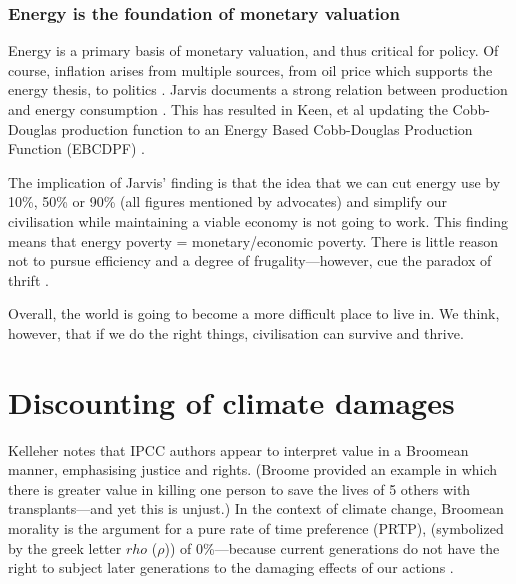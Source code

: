 \documentclass{article}
\begin{document}
\subsubsection{Energy is the foundation of monetary valuation} Energy is a primary basis of monetary valuation, and thus critical for policy. Of course, inflation arises from multiple sources, from oil price \cite{HA2023UnderstandingGlobalDriversOfInflation_HowImportantAreOilPrices} which supports the energy thesis, to politics \cite{WHITEHEAD1979THEPOLITICALCAUSESOFINFLATION}. Jarvis documents a strong relation between production and energy consumption \cite{JARVIS2018EnergyReturns_TheLong-runGrowthOfGlobalIndustrialSociety}. This has resulted in Keen, et al updating the Cobb-Douglas production function to an Energy Based Cobb-Douglas Production Function (EBCDPF) \cite{KEEN2019NoteOnEnergyInProduction}. 

The implication of Jarvis' finding is that the idea that we can cut energy use by 10\%, 50\% or 90\% (all figures mentioned by advocates) and simplify our civilisation while maintaining a viable economy is not going to work. This finding means that energy poverty = monetary/economic poverty. There is little reason not to pursue efficiency and a degree of frugality---however, cue the paradox of thrift \cite{Corden2012GlobalImbalancesAndTheParadoxOfThrift,Vermann2012ParadoxThrift,Yiannis2011DeficitReductionTheAgeOfAusterityAndTheParadoxOfInsolvency,Das2019ParadoxOfAusterityMulti-CountryEvidence}.

Overall, the world is going to become a more difficult place to live in. We think, however, that if we do the right things, civilisation can survive and thrive. 

\section{Discounting of climate damages}
\label{lb:DiscountingClimateDamages}
 Kelleher notes that IPCC authors appear to interpret value in a Broomean manner, emphasising justice and rights.  (Broome provided an example in which there is greater value in killing one person to save the lives of 5 others with transplants---and yet this is unjust.) In the context of climate change, Broomean morality is the argument for a pure rate of time preference (PRTP),  (symbolized by the greek letter $rho$ ($\rho$)) of 0\%---because current generations do not have the right to subject later generations to the damaging effects of our actions \cite[pp. 448-451]{Kelleher_2017PRTP(RPTP),Dietz2008EconEthicsClimate}.  
\end{document}
